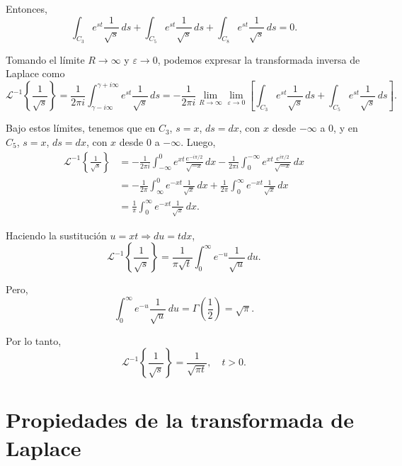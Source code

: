 \begin{ejemplo}
    Entonces,
    $$\int_{C_3} e^{st} \frac{1}{\sqrt{s}} \,ds + \int_{C_5} e^{st} \frac{1}{\sqrt{s}} \,ds + \int_{C_8} e^{st} \frac{1}{\sqrt{s}} \,ds = 0.$$

    Tomando el límite $R \to \infty$ y $\varepsilon \to 0$, podemos expresar la transformada inversa de Laplace como
    $$\mathcal{L}^{-1}\left\{ \frac{1}{\sqrt{s}}\right\} = \frac{1}{2\pi i} \int_{\gamma - i\infty}^{\gamma + i \infty} e^{st} \frac{1}{\sqrt{s}} \,ds = - \frac{1}{2\pi i} \lim_{R\to\infty}  \lim_{\varepsilon \to 0} \left[ \int_{C_3} e^{st} \frac{1}{\sqrt{s}} \,ds +  \int_{C_5} e^{st} \frac{1}{\sqrt{s}} \,ds\right].$$

    Bajo estos límites, tenemos que en $C_3$, $s = x$, $ds = dx$, con $x$ desde $-\infty$ a $0$, y en $C_5$, $s = x$, $ds = dx$, con $x$ desde $0$ a $-\infty$.  Luego,
    \begin{align*}
       \mathcal{L}^{-1}\left\{ \frac{1}{\sqrt{s}}\right\} &= - \frac{1}{2\pi i} \int_{-\infty}^0 e^{xt} \frac{e^{-i\pi/2}}{\sqrt{-x}} \,dx - \frac{1}{2\pi i} \int_0^{-\infty} e^{xt} \frac{e^{i\pi/2}}{\sqrt{-x}} \,dx \\
       &= -\frac{1}{2\pi} \int_{\infty}^0 e^{-xt} \frac{1}{\sqrt{x}} \,dx + \frac{1}{2\pi} \int_0^{\infty} e^{-xt} \frac{1}{\sqrt{x}} \,dx \\
       &= \frac{1}{\pi} \int_0^{\infty} e^{-xt} \frac{1}{\sqrt{x}} \,dx.
    \end{align*}

    Haciendo la sustitución $u = xt \Rightarrow du = t dx$,
    $$ \mathcal{L}^{-1}\left\{ \frac{1}{\sqrt{s}}\right\}  = \frac{1}{\pi \sqrt{t}} \int_0^{\infty} e^{-u} \frac{1}{\sqrt{u}} \,du.$$

    Pero,
    $$\int_0^{\infty} e^{-u} \frac{1}{\sqrt{u}} \,du = \Gamma\left( \frac{1}{2}\right) = \sqrt{\pi}.$$

    Por lo tanto,
    $$ \mathcal{L}^{-1}\left\{ \frac{1}{\sqrt{s}}\right\} = \frac{1}{\sqrt{\pi t}}, \quad t > 0.$$
\end{ejemplo}

\section{Propiedades de la transformada de Laplace}    

